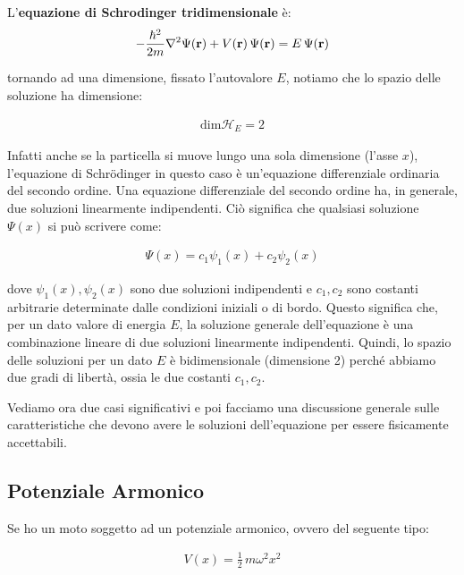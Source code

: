 \begin{mydef}
	L'\textbf{equazione di Schrodinger tridimensionale} è:
\begin{align*}
	-\frac{\hbar^2}{2m} \nabla^{2} \Psi(\vb{r}) + V(\vb{r}) \, \Psi(\vb{r}) = E \, \Psi(\vb{r})
\end{align*}
\end{mydef}

	tornando ad una dimensione, fissato l'autovalore $E$, notiamo che lo spazio delle soluzione ha dimensione:
	
\begin{align*}
	\text{dim} \mathcal{H}_{E} = 2
\end{align*}

\begin{myapprf}
	Infatti anche se la particella si muove lungo una sola dimensione (l'asse $x$), l'equazione di Schrödinger in questo caso è un'equazione differenziale ordinaria del secondo ordine. Una equazione differenziale del secondo ordine ha, in generale, due soluzioni linearmente indipendenti. Ciò significa che qualsiasi soluzione $\Psi(x)$ si può scrivere come:

\begin{align*}
	\Psi(x) = c_1 \psi_1(x) + c_2 \psi_2(x)
\end{align*}

	dove $\psi_1(x),\psi_2(x)$ sono due soluzioni indipendenti e $c_1, c_2$ sono costanti arbitrarie determinate dalle condizioni iniziali o di bordo. Questo significa che, per un dato valore di energia $E$, la soluzione generale dell'equazione è una combinazione lineare di due soluzioni linearmente indipendenti.  Quindi, lo spazio delle soluzioni per un dato $E$ è bidimensionale (dimensione 2) perché abbiamo due gradi di libertà, ossia le due costanti $c_1, c_2$.
\end{myapprf}

	Vediamo ora due casi significativi e poi facciamo una discussione generale sulle caratteristiche che devono avere le soluzioni dell’equazione per essere fisicamente accettabili.

\subsection{Potenziale Armonico}

	Se ho un moto soggetto ad un potenziale armonico, ovvero del seguente tipo:
	
\begin{align*}
	V(x) = \frac{1}{2} \, m\omega^2 x^2
\end{align*}
	
